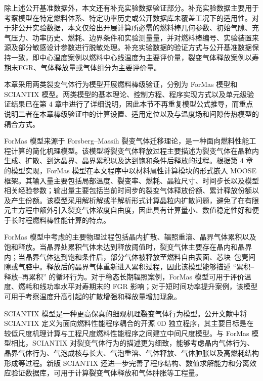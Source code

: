 除上述公开基准数据外，本文还有补充实验数据验证部分。补充实验数据主要用于考察模型在特定燃料体系、特定功率历史或公开数据库未覆盖工况下的适用性。对于非公开实验数据，本文仅给出开展计算所必需的燃料棒几何参数、初始气隙、充气压力、功率历史、燃耗、边界条件和实验测量量，并对燃料棒编号、实验装置来源及部分敏感设计参数进行脱敏处理。补充实验数据的验证方式与公开基准数据保持一致，即中心温度案例以燃料中心线温度为主要评价量，裂变气体释放案例以寿期末FGR、气体释放量或气体组分为主要评价量。


本章采用两类裂变气体行为模型开展燃料棒级验证，分别为 ForMas 模型和 SCIAN\allowbreak TIX 模型。两类模型的基本理论、控制方程、程序实现方式以及单元级验证结果已在第 4 章中进行了详细说明，因此本节不再重复模型公式推导，而重点说明二者在本章棒级验证中的计算设置、适用定位以及与温度场和间隙传热模型的耦合方式。

ForMas 模型来源于 Forsberg--Massih 裂变气体迁移理论，是一种面向燃料性能工程计算的简化机理模型。该模型将裂变气体释放过程主要描述为裂变气体在晶粒内生成、扩散、到达晶界、晶界累积以及达到饱和条件后释放的过程。根据第 4 章的模型实现，ForMas 模型在本文程序中以材料属性计算模块的形式嵌入 MOOSE 框架。其输入量主要包括局部温度、裂变率、燃耗、晶粒尺寸、时间步长以及模型相关经验参数；输出量主要包括当前时间步的裂变气体释放份额、累计释放份额以及产生份额。该模型采用解析解或半解析形式计算晶粒内扩散问题，避免了在有限元主方程中额外引入裂变气体浓度自由度，因此具有计算量小、数值稳定性好和便于长时程燃料棒性能计算的特点。

ForMas 模型中考虑的主要物理过程包括晶内扩散、辐照重溶、晶界气体累积以及饱和释放。当晶界处累积气体未达到释放阈值时，裂变气体主要存在晶内和晶界内；当晶界气体达到饱和条件后，部分气体被释放至燃料自由表面、芯块--包壳间隙或气腔中。释放后的晶界气体重新进入累积过程，因此该模型能够描述 ``累积--释放--再累积'' 的循环行为。对于稳态长期辐照案例，ForMas 模型可用于评价温度、燃耗和线功率水平对寿期末的 FGR 影响；对于短时间功率提升案例，该模型可用于考察温度升高引起的扩散增强和释放量增加现象。

SCIANTIX 模型是一种更高保真的细观机理裂变气体行为模型。公开文献中将 SCIANTIX 定义为面向燃料性能程序耦合的开源 0D 独立程序，其主要目标是在较低尺度机理计算与工程尺度燃料性能程序之间建立中间尺度模型。与 ForMas 模型相比，SCIANTIX 对裂变气体行为的描述更为细致，能够考虑晶内气体行为、晶界气体行为、气泡成核与长大、气泡重溶、气体释放、气体肿胀以及高燃耗结构形成等过程。新版 SCIANTIX 还进一步完善了程序结构、数值求解能力和分离效应验证数据库，可用于计算裂变气体释放和气体肿胀等工程量。

